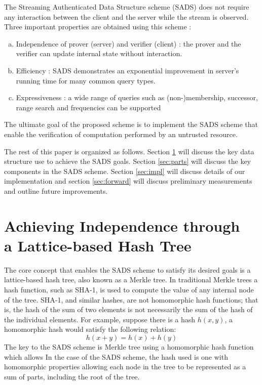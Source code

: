 \documentclass[11pt, letterpaper, oneside]{article}
\begin{document}
	The Streaming Authenticated Data Structure scheme (SADS) \cite{sads} does not require any interaction between the client and the server while the stream is observed.
	Three important properties are obtained using this scheme :
	\begin{enumerate}[a.]
		\item Independence of prover (server) and verifier (client) : the prover and the verifier can update internal state without interaction.
		\item Efficiency : SADS demonstrates an exponential improvement in server's running time for many common query types.
		\item Expressiveness : a wide range of queries such as (non-)membership, successor, range search and frequencies can be supported
	\end{enumerate}
	The ultimate goal of the proposed scheme is to implement the SADS scheme that enable the verification of computation performed by an untrusted resource.

	The rest of this paper is organized as follows.
	Section \ref{sec:tree} will discuss the key data structure use to achieve the SADS goals.
	Section \ref{sec:parts} will discuss the key components in the SADS scheme.
	Section \ref{sec:impl} will discuss details of our implementation and section \ref{sec:forward} will discuss preliminary measurements and outline future improvements.

\section{ Achieving Independence through \\ a Lattice-based Hash Tree }
\label{sec:tree}

	The core concept that enables the SADS scheme to satisfy its desired goals is a lattice-based hash tree, also known as a Merkle tree.
	In traditional Merkle trees a hash function, such as SHA-1, is used to compute the value of any internal node of the tree.
	SHA-1, and similar hashes, are not homomorphic hash functions; that is, the hash of the sum of two elements is not necessarily the sum of the hash of the individual elements.
	For example, suppose there is a hash $h(x, y)$, a homomorphic hash would satisfy the following relation:
	\begin{equation}
		h(x + y) = h(x) + h(y)
	\end{equation}
	The key to the SADS scheme is Merkle tree using a homomorphic hash function which allows 
	In the case of the SADS scheme, the hash used is one with homomorphic properties allowing each node in the tree to be represented as a sum of parts, including the root of the tree.
\end{document}
